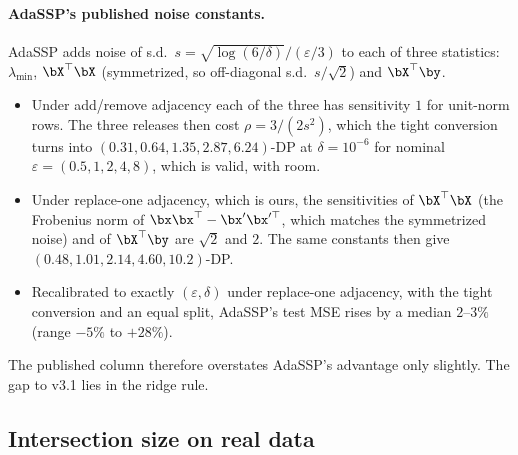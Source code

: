 \paragraph{AdaSSP's published noise constants.} AdaSSP adds noise of s.d.\ $s = \sqrt{\log(6/\delta)}/(\varepsilon/3)$ to each of three statistics: $\lambda_{\min}$, $\bX^\top\bX$ (symmetrized, so off-diagonal s.d.\ $s/\sqrt2$) and $\bX^\top\by$.
\begin{itemize}[noitemsep]
  \item Under add/remove adjacency each of the three has sensitivity $1$ for unit-norm rows. The three releases then cost $\rho = 3/(2s^2)$, which the tight conversion turns into $(0.31, 0.64, 1.35, 2.87, 6.24)$-DP at $\delta = 10^{-6}$ for nominal $\varepsilon = (0.5, 1, 2, 4, 8)$, which is valid, with room.
  \item Under replace-one adjacency, which is ours, the sensitivities of $\bX^\top\bX$ (the Frobenius norm of $\bx\bx^\top - \bx'\bx'^\top$, which matches the symmetrized noise) and of $\bX^\top\by$ are $\sqrt2$ and $2$. The same constants then give $(0.48, 1.01, 2.14, 4.60, 10.2)$-DP.
  \item Recalibrated to exactly $(\varepsilon, \delta)$ under replace-one adjacency, with the tight conversion and an equal split, AdaSSP's test MSE rises by a median $2$--$3\%$ (range $-5\%$ to $+28\%$).
\end{itemize}
The published column therefore overstates AdaSSP's advantage only slightly. The gap to v3.1 lies in the ridge rule.



\subsection{Intersection size on real data}
\label{sec:eval:sweep}

